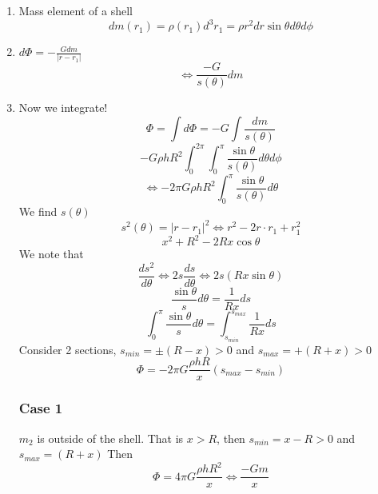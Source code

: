 \documentclass{article}
\newtheorem{one minute paper}[theorem]{One Minute Paper}
\begin{document}
\begin{enumerate}
    \item Mass element of a shell
    \begin{equation}
    dm(r_1) = \rho(r_1)d^3r_1 = \rho r^2dr \sin\theta d\theta d\phi
    \end{equation}
    \item $d\Phi = -\frac{Gdm}{|r-r_1|}$ 
    \begin{equation}
        \iff \frac{-G}{s(\theta)}dm
    \end{equation}
    \item Now we integrate!
    \begin{equation}
        \Phi = \int d\Phi = -G\int \frac{dm}{s(\theta)}
    \end{equation}
    \begin{equation}
        -G\rho h R^2 \int_{0}^{2\pi}\int_{0}^{\pi}\frac{\sin\theta}{s(\theta)}d\theta d\phi
    \end{equation}
    \begin{equation}
        \iff -2\pi G\rho hR^2 \int_{0}^{\pi}\frac{\sin\theta}{s(\theta)}d\theta
    \end{equation}
    We find $s(\theta)$
    \begin{equation}
        s^2(\theta) = |r-r_1|^2 \iff r^2 - 2r \cdot r_1 + r_1^2
    \end{equation}
    \begin{equation}
        x^2 + R^2 - 2Rx\cos\theta 
    \end{equation}
    We note that 
    \begin{equation}
        \frac{d s^2}{d\theta} \iff 2s \frac{ds}{d\theta} \iff 2s (Rx\sin\theta)
    \end{equation}
    \begin{equation}
        \frac{\sin\theta}{s}d\theta = \frac{1}{Rx}ds
    \end{equation}
    \begin{equation}
        \int_{0}^{\pi}\frac{\sin\theta}{s}d\theta = \int_{s_{min}}^{s_{max}}\frac{1}{Rx}ds
    \end{equation}
    Consider 2 sections, $s_{min} = \pm(R-x) > 0$ and $s_{max} = +(R+x) > 0$
    \begin{equation}
        \Phi = -2\pi G \frac{\rho h R}{x}(s_{max} - s_{min})
    \end{equation}
    \subsubsection*{Case 1}
    $m_2$ is outside of the shell. That is $x > R$, then $s_{min} = x - R > 0$ and $s_{max} = (R + x)$ Then 
    \begin{equation}
        \Phi = 4\pi G \frac{\rho h R^2}{x} \iff \frac{-Gm}{x}
    \end{equation}


\end{enumerate}
\end{document}

